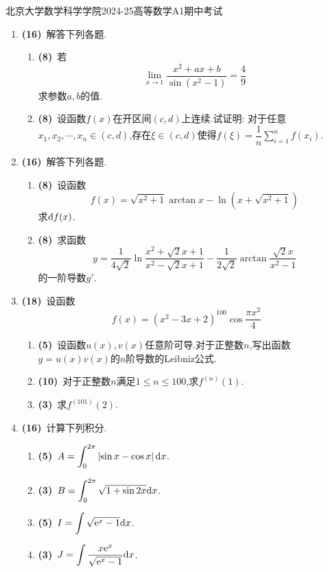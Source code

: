\documentclass{ctexart}
\begin{document}
\pagestyle{empty}
\begin{center}\Large
    北京大学数学科学学院2024-25高等数学A1期中考试
\end{center}
\begin{enumerate}[leftmargin=*,label=\textbf{\arabic*.},topsep=0pt,parsep=0pt,itemsep=0pt,partopsep=0pt]
    \item \textbf{(16)}\ 解答下列各题.
    \begin{enumerate}[label=\textbf{(\arabic*)}]
        \item \textbf{(8)}\ 若$$\lim_{x\to1}\dfrac{x^2+ax+b}{\sin\left(x^2-1\right)}=\dfrac{4}{9}$$求参数$a,b$的值.
        \item \textbf{(8)}\ 设函数$f(x)$在开区间$(c,d)$上连续.试证明:
            对于任意$x_1,x_2,\cdots,x_n\in(c,d)$,存在$\xi\in(c,d)$使得$\displaystyle f(\xi)=\dfrac{1}{n}\sum_{i=1}^{n}f(x_i)$.
    \end{enumerate}

    \item \textbf{(16)}\ 解答下列各题.
    \begin{enumerate}[label=\textbf{(\arabic*)}]
        \item \textbf{(8)}\ 设函数$$f(x)=\sqrt{x^2+1}\arctan x-\ln\left(x+\sqrt{x^2+1}\right)$$求$\mathrm{d} f(x)$.
        \item \textbf{(8)}\ 求函数$$y=\dfrac{1}{4\sqrt{2}}\ln\dfrac{x^2+\sqrt{2}x+1}{x^2-\sqrt{2}x+1}-\dfrac{1}{2\sqrt{2}}\arctan\dfrac{\sqrt{2}x}{x^2-1}$$的一阶导数$y'$.
    \end{enumerate}

    \item \textbf{(18)}\ 设函数$$f(x)=\left(x^2-3x+2\right)^{100}\cos\dfrac{\pi x^2}{4}$$
    \begin{enumerate}[label=\textbf{(\arabic*)}]
        \item \textbf{(5)}\ 设函数$u(x),v(x)$任意阶可导.对于正整数$n$,写出函数$y=u(x)v(x)$的$n$阶导数的Leibniz公式.
        \item \textbf{(10)}\ 对于正整数$n$满足$1\leqslant n\leqslant100$,求$f^{(n)}(1)$.
        \item \textbf{(3)}\ 求$f^{(101)}(2)$.
    \end{enumerate}

    \item \textbf{(16)}\ 计算下列积分.
    \begin{enumerate}[label=\textbf{(\arabic*)}]
        \item \textbf{(5)}\ $\displaystyle A=\int_{0}^{2\pi}\left|\sin x-\cos x\right|\mathrm{d} x$.
        \item \textbf{(3)}\ $\displaystyle B=\int_{0}^{2\pi}\sqrt{1+\sin2x}\mathrm{d} x$.
        \item \textbf{(5)}\ $\displaystyle I=\int\sqrt{\mathrm{e}^x-1}\mathrm{d} x$.
        \item \textbf{(3)}\ $\displaystyle J=\int\dfrac{x\mathrm{e}^x}{\sqrt{\mathrm{e}^x-1}}\mathrm{d} x$.
    \end{enumerate}


\end{enumerate}
\end{document}
